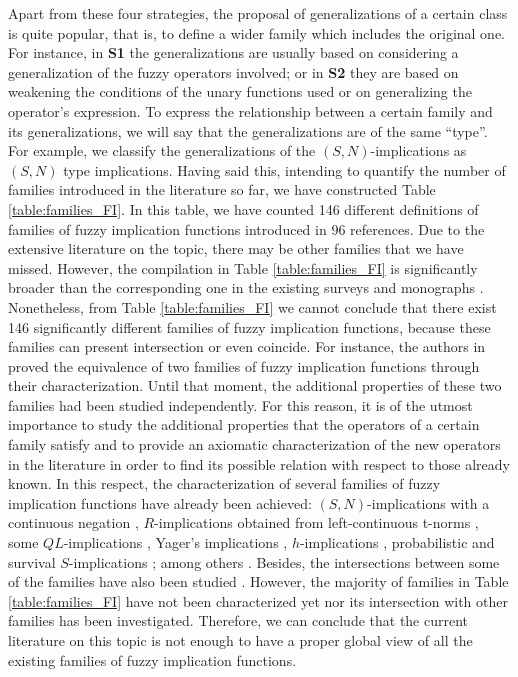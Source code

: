 Apart from these four strategies, the proposal of generalizations of a certain class is quite popular, that is, to define a wider family which includes the original one. For instance, in \textbf{S1} the generalizations are usually based on considering a generalization of the fuzzy operators involved; or in \textbf{S2} they are based on weakening the conditions of the unary functions used or on generalizing the operator's expression. To express the relationship between a certain family and its generalizations, we will say that the generalizations are of the same ``type''. For example, we classify the generalizations of the $(S,N)$-implications as $(S,N)$ type implications. Having said this, intending to quantify the number of families introduced in the literature so far, we have constructed Table \ref{table:families_FI}. In this table, we have counted 146 different definitions of families of fuzzy implication functions introduced in 96 references. Due to the extensive literature on the topic, there may be other families that we have missed. However, the compilation in Table \ref{table:families_FI} is significantly broader than the corresponding one in the existing surveys \cite{Mas2007,Baczynski2008B,Baczynski2015} and monographs \cite{Baczynski2008,Baczynski2013}. Nonetheless, from Table \ref{table:families_FI} we cannot conclude that there exist 146 significantly different families of fuzzy implication functions, because these families can present intersection or even coincide. For instance, the authors in \cite{Massanet2017B} proved the equivalence of two families of fuzzy implication functions through their characterization. Until that moment, the additional properties of these two families had been studied independently. For this reason, it is of the utmost importance to study the additional properties that the operators of a certain family satisfy and to provide an axiomatic characterization of the new operators in the literature in order to find its possible relation with respect to those already known. In this respect, the characterization of several families of fuzzy implication functions have already been achieved: $(S,N)$-implications with a continuous negation \cite{Baczynski2007}, $R$-implications obtained from left-continuous t-norms \cite{Miyakoshi1985,Fodor1994}, some $QL$-implications \cite{Shi2008}, Yager’s implications \cite{Massanet2012B}, $h$-implications \cite{Massanet2012A}, probabilistic and survival $S$-implications \cite{Massanet2017B}; among others \cite{Aguilo2010,Backzynski2009,Zhou2021,Massanet2019B}. Besides, the intersections between some of the families have also been studied \cite{Baczynski2008,Baczynski2008B,Backzynski2010B}. However, the majority of families in Table \ref{table:families_FI} have not been characterized yet nor its intersection with other families has been investigated. Therefore, we can conclude that the current literature on this topic is not enough to have a proper global view of all the existing families of fuzzy implication functions.

